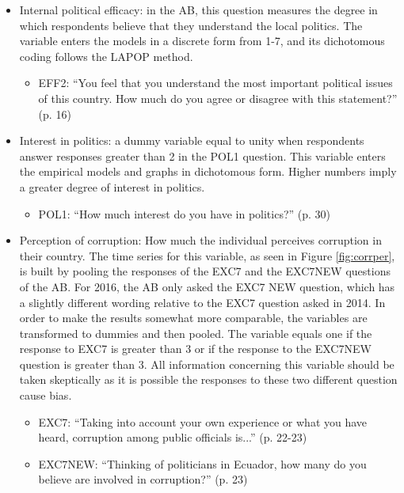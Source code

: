 \documentclass[12pt,a4]{article}\usepackage[]{graphicx}\usepackage[]{xcolor}
\begin{document}
\begin{itemize}
\item Internal political efficacy: in the AB, this question measures the degree in which respondents believe that they understand the local politics. The variable enters the models in a discrete form from 1-7, and its dichotomous coding follows the LAPOP method. 
  \begin{itemize}
    \item EFF2: \enquote{You feel that you understand the most important political issues
of this country. How much do you agree or disagree with this statement?} (p. 16)
  \end{itemize}  
  
\item Interest in politics: a dummy variable equal to unity when respondents answer responses greater than 2 in the POL1 question. This variable enters the empirical models and graphs in dichotomous form. Higher numbers imply a greater degree of interest in politics. 
  \begin{itemize}
    \item POL1: \enquote{How much interest do you have in politics?} (p. 30)
  \end{itemize}  
  
  \item Perception of corruption: How much the individual perceives corruption in their country. The time series for this variable, as seen in Figure \ref{fig:corrper}, is built by pooling the responses of the EXC7 and the EXC7NEW questions of the AB. For 2016, the AB only asked the EXC7 NEW question, which has a slightly different wording relative to the EXC7 question asked in 2014. In order to make the results somewhat more comparable, the variables are transformed to dummies and then pooled. The variable equals one if the response to EXC7 is greater than 3 or if the response to the EXC7NEW question is greater than 3. All information concerning this variable should be taken skeptically as it is possible the responses to these two different question cause bias. 
  \begin{itemize}
    \item EXC7: \enquote{Taking into account your own experience or what you have heard,
corruption among public officials is...} (p. 22-23)
    \item EXC7NEW: \enquote{Thinking of politicians in Ecuador, how many do you believe are
involved in corruption?} (p. 23)
  \end{itemize} 
  

\end{itemize}
\end{document}
